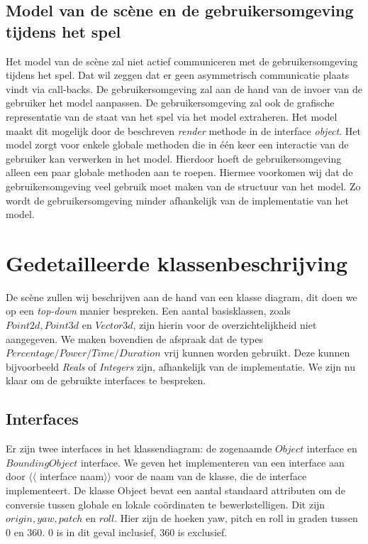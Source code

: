 \documentclass[a4paper,11pt]{article}
\begin{document}
    \subsection{Model van de sc\`ene en de gebruikersomgeving tijdens het spel}
    Het model van de sc\`ene zal niet actief communiceren met de gebruikersomgeving tijdens het spel. Dat wil zeggen dat er geen asymmetrisch communicatie plaats vindt via call-backs. De gebruikersomgeving zal aan de hand van de invoer van de gebruiker het model aanpassen. De gebruikersomgeving zal ook de grafische representatie van de staat van het spel via het model extraheren. Het model maakt dit mogelijk door de beschreven \emph{render} methode in de interface \emph{object}. Het model zorgt voor enkele globale methoden die in \'e\'en keer een interactie van de gebruiker kan verwerken in het model. Hierdoor hoeft de gebruikersomgeving alleen een paar globale methoden aan te roepen. Hiermee voorkomen wij dat de gebruikersomgeving veel gebruik moet maken van de structuur van het model. Zo wordt de gebruikersomgeving minder afhankelijk van de implementatie van het model.

    \section{Gedetailleerde klassenbeschrijving}
    De sc\`ene zullen wij beschrijven aan de hand van een klasse diagram, dit doen we op een \emph{top-down} manier bespreken. Een aantal basisklassen, zoals $Point2d, Point3d$ en $Vector3d$, zijn hierin voor de overzichtelijkheid niet aangegeven. We maken bovendien de afspraak dat de types $Percentage/Power/Time/Duration$ vrij kunnen worden gebruikt. Deze kunnen bijvoorbeeld \emph{Reals} of \emph{Integers} zijn, afhankelijk van de implementatie.  We zijn nu klaar om de gebruikte interfaces te bespreken.

\subsection{Interfaces}
Er zijn twee interfaces in het klassendiagram: de zogenaamde $Object$ interface en $BoundingObject$ interface. We geven het implementeren van een interface aan door $\langle\langle$ interface naam$\rangle \rangle$ voor de naam van de klasse, die de interface implementeert.  De klasse Object bevat een aantal standaard attributen om de conversie tussen globale en lokale co\"ordinaten te bewerkstelligen. Dit zijn $origin, yaw, patch$ en $roll$. Hier zijn de hoeken yaw, pitch en roll in graden tussen 0 en 360. 0 is in dit geval inclusief, 360 is exclusief.
\end{document}
